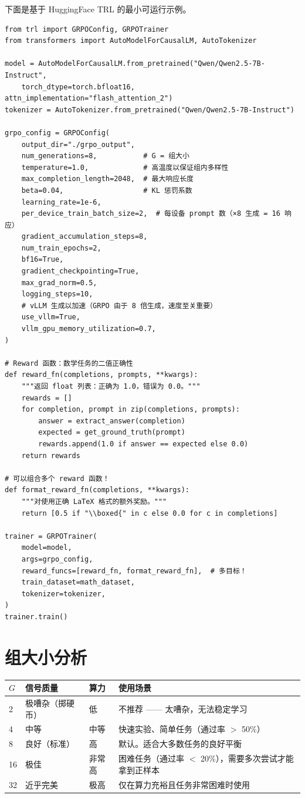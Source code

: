 下面是基于 HuggingFace TRL 的最小可运行示例。

\begin{lstlisting}[style=pythonstyle]
from trl import GRPOConfig, GRPOTrainer
from transformers import AutoModelForCausalLM, AutoTokenizer

model = AutoModelForCausalLM.from_pretrained("Qwen/Qwen2.5-7B-Instruct",
    torch_dtype=torch.bfloat16, attn_implementation="flash_attention_2")
tokenizer = AutoTokenizer.from_pretrained("Qwen/Qwen2.5-7B-Instruct")

grpo_config = GRPOConfig(
    output_dir="./grpo_output",
    num_generations=8,           # G = 组大小
    temperature=1.0,             # 高温度以保证组内多样性
    max_completion_length=2048,  # 最大响应长度
    beta=0.04,                   # KL 惩罚系数
    learning_rate=1e-6,
    per_device_train_batch_size=2,  # 每设备 prompt 数（×8 生成 = 16 响应）
    gradient_accumulation_steps=8,
    num_train_epochs=2,
    bf16=True,
    gradient_checkpointing=True,
    max_grad_norm=0.5,
    logging_steps=10,
    # vLLM 生成以加速（GRPO 由于 8 倍生成，速度至关重要）
    use_vllm=True,
    vllm_gpu_memory_utilization=0.7,
)

# Reward 函数：数学任务的二值正确性
def reward_fn(completions, prompts, **kwargs):
    """返回 float 列表：正确为 1.0，错误为 0.0。"""
    rewards = []
    for completion, prompt in zip(completions, prompts):
        answer = extract_answer(completion)
        expected = get_ground_truth(prompt)
        rewards.append(1.0 if answer == expected else 0.0)
    return rewards

# 可以组合多个 reward 函数！
def format_reward_fn(completions, **kwargs):
    """对使用正确 LaTeX 格式的额外奖励。"""
    return [0.5 if "\\boxed{" in c else 0.0 for c in completions]

trainer = GRPOTrainer(
    model=model,
    args=grpo_config,
    reward_funcs=[reward_fn, format_reward_fn],  # 多目标！
    train_dataset=math_dataset,
    tokenizer=tokenizer,
)
trainer.train()
\end{lstlisting}

\section{组大小分析}
\label{group-size-analysis}

\noindent\begin{tabularx}{\linewidth}{@{}l Z{0.45} Z{0.3} Z{2.25}@{}}
\toprule
$G$ & \textbf{信号质量} & \textbf{算力} & \textbf{使用场景} \\
 & 极嘈杂（掷硬币） & 低 & 不推荐 —— 太嘈杂，无法稳定学习 \\
4 & 中等 & 中等 & 快速实验、简单任务（通过率 $>$ 50\%） \\
8 & 良好（标准） & 高 & 默认。适合大多数任务的良好平衡 \\
16 & 极佳 & 非常高 & 困难任务（通过率 $<$ 20\%），需要多次尝试才能拿到正样本 \\
32 & 近乎完美 & 极高 & 仅在算力充裕且任务非常困难时使用 \\
\bottomrule
\end{tabularx}

